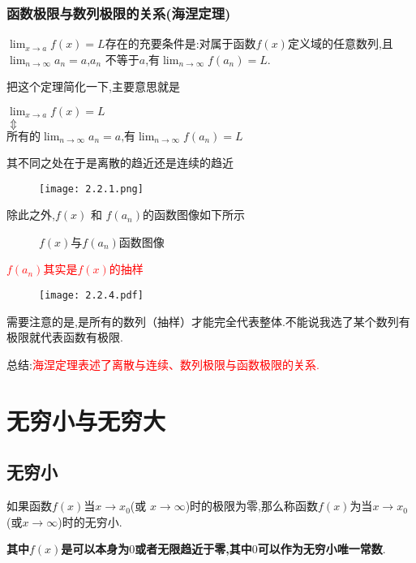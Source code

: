 \documentclass[12pt, a4paper, oneside, UTF8]{ctexbook}  %
\begin{document}
\begin{sloppypar}
    \subsubsection{函数极限与数列极限的关系(海涅定理)}
    \begin{them}{}{}
        $\lim_{x \to a}f(x)=L$存在的充要条件是:对属于函数$f(x)$定义域的任意数列,且$\lim_{n\to\infty}a_n=a$,$a_n$ 不等于$a$,有$\lim_{n\to\infty}f(a_n)=L$.
    \end{them}
    把这个定理简化一下,主要意思就是
    \begin{center}
        $\lim_{x\to a}f(x)=L$\\
        $\Updownarrow $ \\
        $\text{所有的}\lim_{n\to\infty}a_n=a\text{,有}\lim_{n\to\infty}f(a_n)=L$
    \end{center}
    其不同之处在于是离散的趋近还是连续的趋近
    \begin{figure}[H]
        \centering \texttt{[image: 2.2.1.png]}
    \end{figure}
    除此之外,$f(x)$ 和 $f(a_n)$的函数图像如下所示
    \begin{figure}[H] \centering
        \caption{$f(x)$与$f(a_n)$函数图像}
    \end{figure}

    \textcolor{red}{$f(a_n)$其实是$f(x)$的抽样}
    \begin{figure}[htbp]
        \centering \texttt{[image: 2.2.4.pdf]}
    \end{figure}
    需要注意的是,是所有的数列（抽样）才能完全代表整体.不能说我选了某个数列有极限就代表函数有极限.

    总结:\textcolor{red}{海涅定理表述了离散与连续、数列极限与函数极限的关系.}
    \section{无穷小与无穷大}

    \subsection{无穷小}
    \begin{defn}{}{}
        如果函数$f(x)$当$x\to x_0$(或 $x\to\infty$)时的极限为零,那么称函数$f(x)$为当$x\to x_0$(或$x\to\infty$)时的无穷小.
    \end{defn}
    \textbf{其中$f(x)$是可以本身为$0$或者无限趋近于零,其中$0$可以作为无穷小唯一常数}.


\end{sloppypar}
\end{document}
